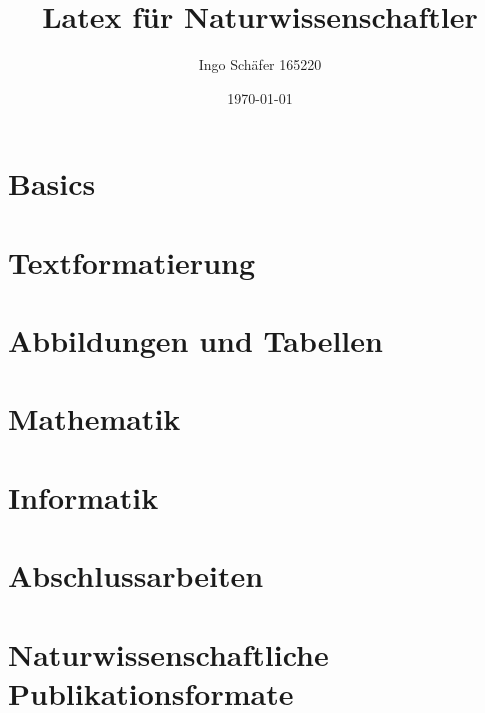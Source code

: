 \documentclass[a4paper,portrait,onecolumn,11pt, titlepage, tableofcontents]{article} %
\title{Latex für Naturwissenschaftler}
\author{Ingo Schäfer 165220}
\date{\today}
\begin{document}


\maketitle

\tableofcontents
\thispagestyle{empty}

\pagebreak
\section{Basics}					%
\label{sec:basics}


\pagebreak
\section{Textformatierung}				%
\label{sec:textformatierung}


\pagebreak
\section{Abbildungen und Tabellen}			%
\label{sec:floats}


\pagebreak
\section{Mathematik}					%
\label{sec:mathematik}


\pagebreak
\section{Informatik}					%
\label{sec:informatik}


\pagebreak
\section{Abschlussarbeiten}				%
\label{sec:abschlussarbeiten}


\pagebreak
\section{Naturwissenschaftliche Publikationsformate}	%


\pagebreak
\listoffigures				%
\listoftables				%

\label{LastPage}
\end{document}
